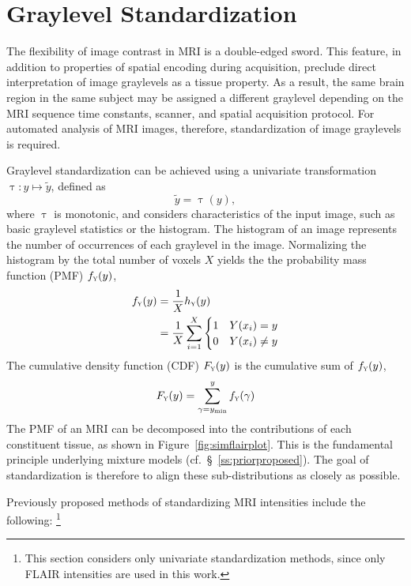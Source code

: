 \section{Graylevel Standardization}\label{s:pre-ystd}
The flexibility of image contrast in MRI is a double-edged sword.
This feature, in addition to properties of spatial encoding during acquisition,
preclude direct interpretation of image graylevels as a tissue property.
As a result, the same brain region in the same subject may be assigned a different graylevel
depending on the MRI sequence time constants, scanner, and spatial acquisition protocol.
For automated analysis of MRI images, therefore, standardization of image graylevels is required.
\par
Graylevel standardization can be achieved using a univariate transformation
$\uptau:y\mapsto\tilde{y}$, defined as
\begin{equation}
\tilde{y} = \uptau(y),
\end{equation}
where $\uptau$ is monotonic, and considers characteristics of the input image,
such as basic graylevel statistics or the histogram.
The histogram of an image represents the number of occurrences of each graylevel in the image.
Normalizing the histogram by the total number of voxels $X$
yields the the probability mass function (PMF) $f_{\textsc{y}}(y)$,
\begin{align}
f_{\textsc{y}}(y) &= \frac{1}{X}h_{\textsc{y}}(y)\nonumber\\
&= \frac{1}{X}\sum_{i=1}^{X}
\begin{cases}
1&Y(x_i) = y\\
0&Y(x_i) \ne y\\
\end{cases}
\end{align}
The cumulative density function (CDF) $F_{\textsc{y}}(y)$ is the cumulative sum of $f_{\textsc{y}}(y)$,
\begin{equation}
F_{\textsc{y}}(y) = \sum_{\gamma=y_{\min}}^{y} f_{\textsc{y}}(\gamma)
\end{equation}
The PMF of an MRI can be decomposed into the contributions of each constituent tissue,
as shown in Figure~\ref{fig:simflairplot}.
This is the fundamental principle underlying mixture models (cf.~\S~\ref{ss:priorproposed}).
The goal of standardization is therefore to align these sub-distributions as closely as possible.
\par
Previously proposed methods of standardizing MRI intensities include the following:%
\footnote{This section considers only univariate standardization methods,
  since only FLAIR intensities are used in this work.}
